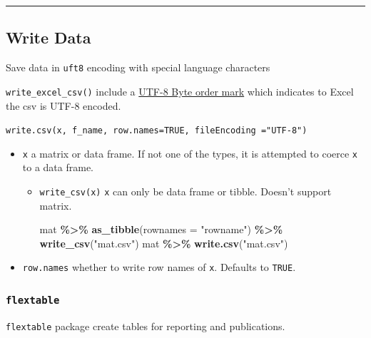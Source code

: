\documentclass[
  a4paper,
  twoside,
  openright]{book}
\newenvironment{Shaded}{\begin{snugshade}}{\end{snugshade}}
\newcommand{\AttributeTok}[1]{\textcolor[rgb]{0.13,0.29,0.53}{#1}}
\newcommand{\FunctionTok}[1]{\textcolor[rgb]{0.13,0.29,0.53}{\textbf{#1}}}
\newcommand{\NormalTok}[1]{#1}
\newcommand{\SpecialCharTok}[1]{\textcolor[rgb]{0.81,0.36,0.00}{\textbf{#1}}}
\newcommand{\StringTok}[1]{\textcolor[rgb]{0.31,0.60,0.02}{#1}}
\theoremstyle{definition}
\theoremstyle{definition}
\theoremstyle{definition}
\theoremstyle{definition}
\theoremstyle{remark}
\begin{document}
\begin{center}\rule{0.5\linewidth}{0.5pt}\end{center}

\subsection{Write Data}\label{write-data}

Save data in \texttt{uft8} encoding with special language characters

\texttt{write\_excel\_csv()} include a \href{https://en.wikipedia.org/wiki/Byte_order_mark}{UTF-8 Byte order mark} which indicates to Excel the csv is UTF-8 encoded.

\texttt{write.csv(x,\ f\_name,\ row.names=TRUE,\ fileEncoding\ ="UTF-8")}

\begin{itemize}
\item
  \texttt{x} a matrix or data frame. If not one of the types, it is attempted to coerce \texttt{x} to a data frame.

  \begin{itemize}
  \item
    \texttt{write\_csv(x)} \texttt{x} can only be data frame or tibble. Doesn't support matrix.

\begin{Shaded}
\begin{Highlighting}[]
\NormalTok{mat }\SpecialCharTok{\%\textgreater{}\%} \FunctionTok{as\_tibble}\NormalTok{(}\AttributeTok{rownames =} \StringTok{"rowname"}\NormalTok{) }\SpecialCharTok{\%\textgreater{}\%} \FunctionTok{write\_csv}\NormalTok{(}\StringTok{"mat.csv"}\NormalTok{)}
\NormalTok{mat }\SpecialCharTok{\%\textgreater{}\%} \FunctionTok{write.csv}\NormalTok{(}\StringTok{"mat.csv"}\NormalTok{)}
\end{Highlighting}
\end{Shaded}
  \end{itemize}
\item
  \texttt{row.names} whether to write row names of \texttt{x}. Defaults to \texttt{TRUE}.
\end{itemize}

\subsubsection{\texorpdfstring{\texttt{flextable}}{flextable}}\label{flextable}

\texttt{flextable} package create tables for reporting and publications.
\end{document}
